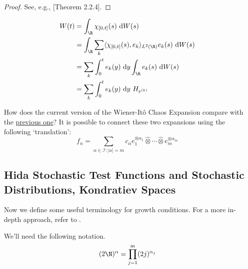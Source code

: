 \begin{proof}
	See, e.g., \cite{holden1996stochastic}[Theorem 2.2.4]. 
\end{proof}

\begin{example}
	\begin{equation*}
		\begin{aligned}
			W(t) &= \int_\R \chi_{[0,t]}(s) ~\mathrm{d}W(s) \\
					 &= \int_\R \sum_k \langle \chi_{[0,t]}(s), e_k \rangle_{L^2(\R)} e_k(s) ~\mathrm{d}W(s) \\
					 &= \sum_k \int_0^t e_k(y) ~\mathrm{d}y \int_\R e_k(s) ~\mathrm{d}W(s) \\
					 &= \sum_k \int_0^t e_k(y) ~\mathrm{d}y ~ H_{\varepsilon^{(k)}}
		\end{aligned}
	\end{equation*}
\end{example}

How does the current version of the Wiener-Itô Chaos Expansion compare with the \hyperref[thm:chaos-expansion]{previous one}? It is possible to connect these two expansions using the following `translation':
\begin{equation}\label{eq:202405131754}
f_n = \sum_{\alpha \in \mathcal{I} : | \alpha | = m} c_\alpha e_1^{\otimes \alpha_1} \hat{\otimes} \cdots \hat{\otimes} e_m^{\otimes \alpha_m}
\end{equation}

\subsection*{Hida Stochastic Test Functions and Stochastic Distributions, Kondratiev Spaces}

Now we define some useful terminology for growth conditions. For a more in-depth approach, refer to \cite{holden1996stochastic}.

We'll need the following notation. 
\[
	(2\N)^\alpha = \prod_{j=1}^m (2j)^{\alpha_j}
\]

